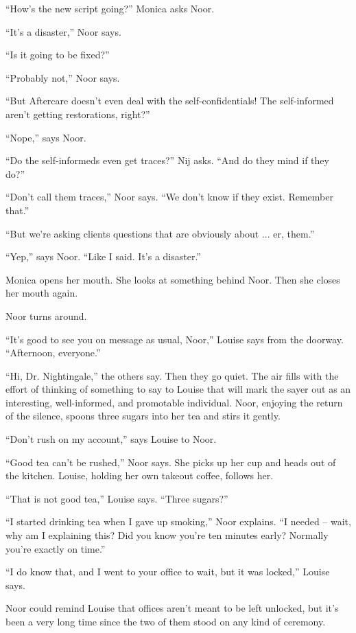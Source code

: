 \documentclass[12pt,a5paper]{book}
\newcommand{\qm}[1]{“#1”}
\begin{document}
\qm{How's the new script going?} Monica asks Noor.

\qm{It's a disaster,} Noor says.

\qm{Is it going to be fixed?}

\qm{Probably not,} Noor says.

\qm{But Aftercare doesn't even deal with the self-confidentials! The self-informed aren't getting restorations, right?}

\qm{Nope,} says Noor.

\qm{Do the self-informeds even get traces?} Nij asks. \qm{And do they mind if they do?}

\qm{Don't call them traces,} Noor says. \qm{We don't know if they exist. Remember that.}

\qm{But we're asking clients questions that are obviously about ... er, them.}

\qm{Yep,} says Noor. \qm{Like I said. It's a disaster.}

Monica opens her mouth. She looks at something behind Noor. Then she closes her mouth again.

Noor turns around.

\qm{It's good to see you on message as usual, Noor,} Louise says from the doorway. \qm{Afternoon, everyone.}

\qm{Hi, Dr. Nightingale,} the others say. Then they go quiet. The air fills with the effort of thinking of something to say to Louise that will mark the sayer out as an interesting, well-informed, and promotable individual. Noor, enjoying the return of the silence, spoons three sugars into her tea and stirs it gently.

\qm{Don't rush on my account,} says Louise to Noor.

\qm{Good tea can't be rushed,} Noor says. She picks up her cup and heads out of the kitchen. Louise, holding her own takeout coffee, follows her.

\qm{That is not good tea,} Louise says. \qm{Three sugars?}

\qm{I started drinking tea when I gave up smoking,} Noor explains. \qm{I needed – wait, why am I explaining this? Did you know you're ten minutes early? Normally you're exactly on time.}

\qm{I do know that, and I went to your office to wait, but it was locked,} Louise says.

Noor could remind Louise that offices aren't meant to be left unlocked, but it's been a very long time since the two of them stood on any kind of ceremony.
\end{document}

